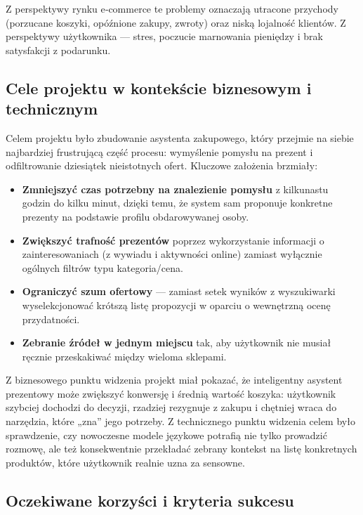 \documentclass[polish,edition=2025]{zpiday}
\begin{document}
Z perspektywy rynku e‑commerce te problemy oznaczają utracone przychody (porzucane koszyki, opóźnione zakupy, zwroty) oraz niską lojalność klientów. Z perspektywy użytkownika — stres, poczucie marnowania pieniędzy i brak satysfakcji z podarunku.

\subsection{Cele projektu w kontekście biznesowym i technicznym}

Celem projektu było zbudowanie asystenta zakupowego, który przejmie na siebie najbardziej frustrującą część procesu: wymyślenie pomysłu na prezent i odfiltrowanie dziesiątek nieistotnych ofert. Kluczowe założenia brzmiały:

\begin{itemize}
    \item \textbf{Zmniejszyć czas potrzebny na znalezienie pomysłu} z kilkunastu godzin do kilku minut, dzięki temu, że system sam proponuje konkretne prezenty na podstawie profilu obdarowywanej osoby.
    \item \textbf{Zwiększyć trafność prezentów} poprzez wykorzystanie informacji o zainteresowaniach (z wywiadu i aktywności online) zamiast wyłącznie ogólnych filtrów typu kategoria/cena.
    \item \textbf{Ograniczyć szum ofertowy} — zamiast setek wyników z wyszukiwarki wyselekcjonować krótszą listę propozycji w oparciu o wewnętrzną ocenę przydatności.
    \item \textbf{Zebranie źródeł w jednym miejscu} tak, aby użytkownik nie musiał ręcznie przeskakiwać między wieloma sklepami.
\end{itemize}

Z biznesowego punktu widzenia projekt miał pokazać, że inteligentny asystent prezentowy może zwiększyć konwersję i średnią wartość koszyka: użytkownik szybciej dochodzi do decyzji, rzadziej rezygnuje z zakupu i chętniej wraca do narzędzia, które „zna” jego potrzeby. Z technicznego punktu widzenia celem było sprawdzenie, czy nowoczesne modele językowe potrafią nie tylko prowadzić rozmowę, ale też konsekwentnie przekładać zebrany kontekst na listę konkretnych produktów, które użytkownik realnie uzna za sensowne.

\subsection{Oczekiwane korzyści i kryteria sukcesu}
\end{document}
